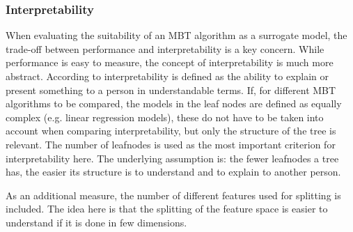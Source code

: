 \vspace{0.5cm}
\subsubsection{Interpretability}
When evaluating the suitability of an MBT algorithm as a surrogate model, the trade-off between performance and interpretability is a key concern. While performance is easy to measure, the concept of interpretability is much more abstract.
According to \citet{DoshiVelez.2017} interpretability is defined as the ability to explain or present something to a person in understandable terms. If, for different MBT algorithms to be compared, the models in the leaf nodes are defined as equally complex (e.g. linear regression models), these do not have to be taken into account when comparing interpretability, but only the structure of the tree is relevant. The number of leafnodes is used as the most important criterion for interpretability here.  The underlying assumption is: the fewer leafnodes a tree has, the easier its structure is to understand and to explain to another person.

As an additional measure, the number of different features used for splitting is included. The idea here is that the splitting of the feature space is easier to understand if it is done in few dimensions.



